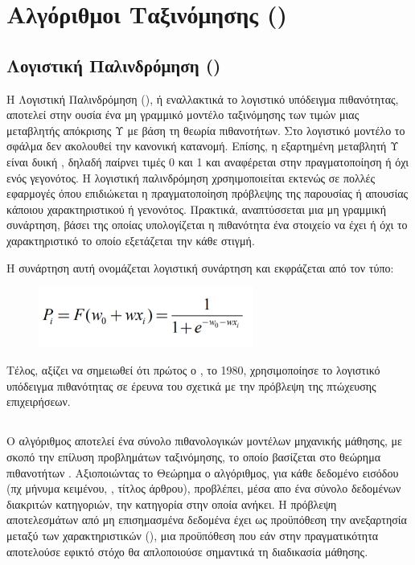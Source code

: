 \section{Αλγόριθμοι Ταξινόμησης ()}

\subsection{Λογιστική Παλινδρόμηση ()}
Η Λογιστική Παλινδρόμηση (), ή εναλλακτικά το λογιστικό υπόδειγμα πιθανότητας, αποτελεί στην ουσία ένα μη γραμμικό μοντέλο ταξινόμησης των τιμών μιας μεταβλητής απόκρισης Υ με βάση τη θεωρία πιθανοτήτων. Στο λογιστικό μοντέλο το σφάλμα δεν ακολουθεί την κανονική κατανομή. Επίσης, η εξαρτημένη μεταβλητή Υ είναι δυική , δηλαδή παίρνει τιμές 0 και 1 και αναφέρεται στην πραγματοποίηση ή όχι ενός γεγονότος. Η λογιστική παλινδρόμηση χρσηιμοποιείται εκτενώς σε πολλές εφαρμογές όπου επιδιώκεται η πραγματοποίηση πρόβλεψης της παρουσίας ή απουσίας κάποιου χαρακτηριστικού ή γενονότος.
Πρακτικά, αναπτύσσεται μια μη γραμμική συνάρτηση, βάσει της οποίας υπολογίζεται η πιθανότητα ένα στοιχείο να έχει ή όχι το χαρακτηριστικό το οποίο εξετάζεται την κάθε στιγμή. 

Η συνάρτηση αυτή ονομάζεται λογιστική συνάρτηση και εκφράζεται από τον τύπο:

\begin{figure} [ht!]
\centering
\includegraphics[width=\textwidth,height=2cm,keepaspectratio]{pictures/2logisticR.png} \label{figure2.0}
\end{figure}
\clearpage

Τέλος, αξίζει να σημειωθεί ότι πρώτος ο , το 1980, χρησιμοποίησε το λογιστικό υπόδειγμα πιθανότητας σε έρευνα του σχετικά με την πρόβλεψη της πτώχευσης επιχειρήσεων. \cite{ohlson1980}




\subsection{}
Ο αλγόριθμος  αποτελεί ένα σύνολο πιθανολογικών μοντέλων μηχανικής μάθησης, με σκοπό την επίλυση προβλημάτων ταξινόμησης, το οποίο βασίζεται στο θεώρημα πιθανοτήτων .
Αξιοποιώντας το Θεώρημα  ο αλγόριθμος, για κάθε δεδομένο εισόδου (πχ μήνυμα κειμένου, , τίτλος άρθρου), προβλέπει, μέσα απο ένα σύνολο δεδομένων διακριτών κατηγοριών, την κατηγορία στην οποία ανήκει. Η πρόβλεψη αποτελεσμάτων από μη επισημασμένα δεδομένα έχει ως προϋπόθεση την ανεξαρτησία μεταξύ των χαρακτηριστικών (), μια προϋπόθεση που εάν στην πραγματικότητα αποτελούσε εφικτό στόχο θα απλοποιούσε σημαντικά τη διαδικασία μάθησης.


